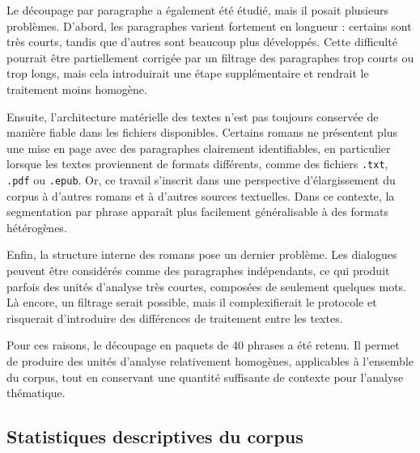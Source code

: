 Le découpage par paragraphe a également été étudié, mais il posait plusieurs problèmes. D'abord, les paragraphes varient fortement en longueur : certains sont très courts, tandis que d'autres sont beaucoup plus développés. Cette difficulté pourrait être partiellement corrigée par un filtrage des paragraphes trop courts ou trop longs, mais cela introduirait une étape supplémentaire et rendrait le traitement moins homogène.

Ensuite, l'architecture matérielle des textes n'est pas toujours conservée de manière fiable dans les fichiers disponibles. Certains romans ne présentent plus une mise en page avec des paragraphes clairement identifiables, en particulier lorsque les textes proviennent de formats différents, comme des fichiers \texttt{.txt}, \texttt{.pdf} ou \texttt{.epub}. Or, ce travail s'inscrit dans une perspective d'élargissement du corpus à d'autres romans et à d'autres sources textuelles. Dans ce contexte, la segmentation par phrase apparaît plus facilement généralisable à des formats hétérogènes.

Enfin, la structure interne des romans pose un dernier problème. Les dialogues peuvent être considérés comme des paragraphes indépendants, ce qui produit parfois des unités d'analyse très courtes, composées de seulement quelques mots. Là encore, un filtrage serait possible, mais il complexifierait le protocole et risquerait d'introduire des différences de traitement entre les textes.

Pour ces raisons, le découpage en paquets de 40 phrases a été retenu. Il permet de produire des unités d'analyse relativement homogènes, applicables à l'ensemble du corpus, tout en conservant une quantité suffisante de contexte pour l'analyse thématique.
\newpage
\subsection{Statistiques descriptives du corpus}


